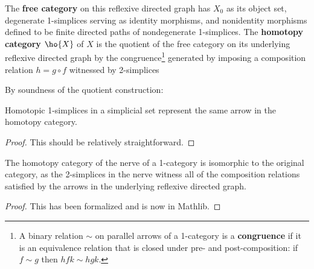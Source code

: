 \begin{definition}\label{defn:homotopy-cat}
    \leanok
 The \textbf{free category} on this reflexive directed graph has $X_0$ as its object set, degenerate 1-simplices serving as identity morphisms, and nonidentity morphisms defined to be finite directed paths of nondegenerate 1-simplices. The \textbf{homotopy category} $\ho{X}$ of $X$ is the quotient of the free category on its underlying reflexive directed graph by the congruence\footnote{A binary relation $\sim$ on parallel arrows of a 1-category is a \textbf{congruence} if it is an equivalence relation that is closed under pre- and post-composition: if $f \sim g$ then $hfk \sim hgk$.} generated by imposing a composition relation $h = g \circ f$ witnessed by 2-simplices
   \begin{center}
   \end{center}
   \end{definition}

By soundness of the quotient construction:

\begin{lem}\label{lem:1-simplex-htpy-in-homotopy-cat}
  Homotopic 1-simplices in a simplicial set represent the same arrow in the homotopy category.
\end{lem}
\begin{proof}
This should be relatively straightforward.
\end{proof}

\begin{proposition}\label{prop:nerve-reflective}
  \leanok
  The homotopy category of the nerve of a 1-category is isomorphic to the original category, as the 2-simplices in the nerve witness all of the composition relations satisfied by the arrows in the underlying reflexive directed graph.
\end{proposition}
\begin{proof}
  \leanok
  This has been formalized and is now in Mathlib.
\end{proof}


